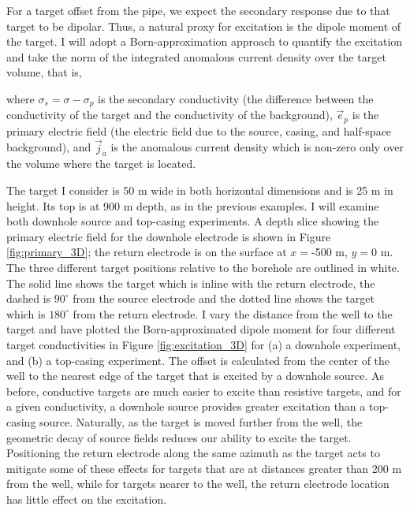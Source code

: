 For a target offset from the pipe, we expect the secondary response due to that target to be dipolar. Thus, a natural proxy for excitation is the dipole moment of the target. I will adopt a Born-approximation approach to quantify the excitation and take the norm of the integrated anomalous current density over the target volume, that is,

where $\sigma_s = \sigma - \sigma_p$ is the secondary conductivity (the difference between the conductivity of the target and the conductivity of the background), $\vec{e}_p$ is the primary electric field (the electric field due to the source, casing, and half-space background), and $\vec{j}_a$ is the anomalous current density which is non-zero only over the volume where the target is located.

The target I consider is 50 m wide in both horizontal dimensions and is 25 m in height. Its top is at 900 m depth, as in the previous examples. I will examine both downhole source and top-casing experiments. A depth slice showing the primary electric field for the downhole electrode is shown in Figure \ref{fig:primary_3D}; the return electrode is on the surface at $x=$-500 m, $y=$0 m. The three different target positions relative to the borehole are outlined in white. The solid line shows the target which is inline with the return electrode, the dashed is $90^\circ$ from the source electrode and the dotted line shows the target which is $180^\circ$ from the return electrode. I vary the distance from the well to the target and have plotted the Born-approximated dipole moment for four different target conductivities in Figure \ref{fig:excitation_3D} for (a) a downhole experiment, and (b) a top-casing experiment. The offset is calculated from the center of the well to the nearest edge of the target that is excited by a downhole source. As before, conductive targets are much easier to excite than resistive targets, and for a given conductivity, a downhole source provides greater excitation than a top-casing source. Naturally, as the target is moved further from the well, the geometric decay of source fields reduces our ability to excite the target. Positioning the return electrode along the same azimuth as the target acts to mitigate some of these effects for targets that are at distances greater than 200 m from the well, while for targets nearer to the well, the return electrode location has little effect on the excitation.







